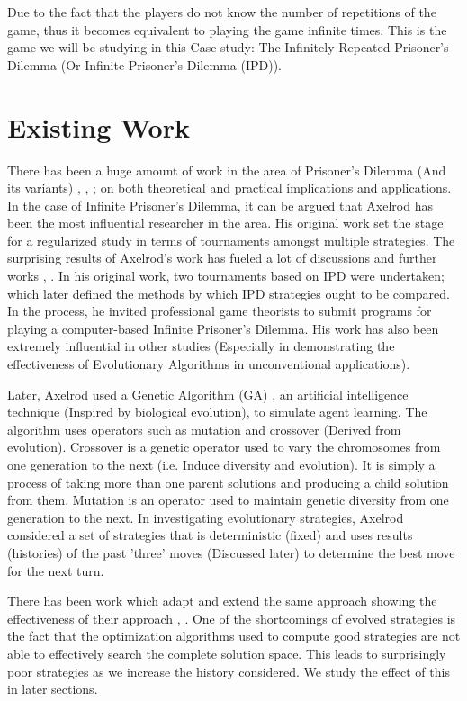 \documentclass[a4paper]{article}
\begin{document}
	Due to the fact that the players do not know the number of repetitions of the game, thus it becomes equivalent to playing the game infinite times.	This is the game we will be studying in this Case study: The Infinitely Repeated Prisoner's Dilemma (Or Infinite Prisoner's Dilemma (IPD)).
	
	\section{Existing Work}
	
	There has been a huge amount of work in the area of Prisoner's Dilemma (And its variants) \cite{existA}, \cite{existB}, \cite{existC}; on both theoretical and practical implications and applications. In the case of Infinite Prisoner's Dilemma, it can be argued that Axelrod \cite{axelrod} has been the most influential researcher in the area. His original work set the stage for a regularized study in terms of tournaments amongst multiple strategies. The surprising results of Axelrod's work \cite{axelrod} has fueled a lot of discussions and further works \cite{existA}, \cite{optimalipd}. In his original work, two tournaments based on IPD were undertaken; which later defined the methods by which IPD strategies ought to be compared. In the process, he invited professional game theorists to submit programs for playing a computer-based Infinite Prisoner's Dilemma. His work has also been extremely influential in other studies (Especially in demonstrating the effectiveness of Evolutionary Algorithms in unconventional applications).
	
	Later, Axelrod used a Genetic Algorithm (GA) \cite{genetic}, an artificial intelligence technique (Inspired by biological evolution), to simulate agent learning. The algorithm uses operators such as mutation and crossover (Derived from evolution). Crossover is a genetic operator used to vary the chromosomes from one generation to the next (i.e. Induce diversity and evolution). It is simply a process of taking more than one parent solutions and producing a child solution from them. Mutation is an operator used to maintain genetic diversity from one generation to the next. In investigating evolutionary strategies, Axelrod considered a set of strategies that is deterministic (fixed) and uses results (histories) of the past 'three' moves (Discussed later) to determine the best move for the next turn.
	
	There has been work which adapt and extend the same approach showing the effectiveness of their approach \cite{existC}, \cite{optimalipd}. One of the shortcomings of evolved strategies is the fact that the optimization algorithms used to compute good strategies are not able to effectively search the complete solution space. This leads to surprisingly poor strategies as we increase the history considered. We study the effect of this in later sections.
	
\end{document}
